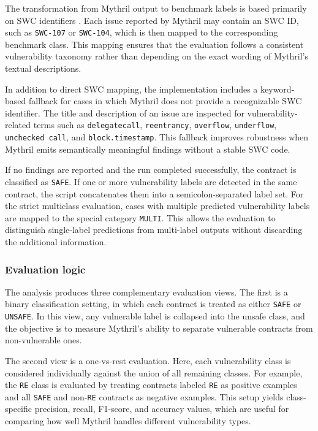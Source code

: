 \documentclass[a4paper,11pt]{article}\usepackage{graphicx} %
\begin{document}
The transformation from Mythril output to benchmark labels is based primarily on SWC identifiers \cite{noauthor_smart_nodate}. Each issue reported by Mythril may contain an SWC ID, such as \texttt{SWC-107} or \texttt{SWC-104}, which is then mapped to the corresponding benchmark class. This mapping ensures that the evaluation follows a consistent vulnerability taxonomy rather than depending on the exact wording of Mythril's textual descriptions.

In addition to direct SWC mapping, the implementation includes a keyword-based fallback for cases in which Mythril does not provide a recognizable SWC identifier. The title and description of an issue are inspected for vulnerability-related terms such as \texttt{delegatecall}, \texttt{reentrancy}, \texttt{overflow}, \texttt{underflow}, \texttt{unchecked call}, and \texttt{block.timestamp}. This fallback improves robustness when Mythril emits semantically meaningful findings without a stable SWC code.

If no findings are reported and the run completed successfully, the contract is classified as \texttt{SAFE}. If one or more vulnerability labels are detected in the same contract, the script concatenates them into a semicolon-separated label set. For the strict multiclass evaluation, cases with multiple predicted vulnerability labels are mapped to the special category \texttt{MULTI}. This allows the evaluation to distinguish single-label predictions from multi-label outputs without discarding the additional information.

\subsubsection{Evaluation logic}

The analysis produces three complementary evaluation views. The first is a binary classification setting, in which each contract is treated as either \texttt{SAFE} or \texttt{UNSAFE}. In this view, any vulnerable label is collapsed into the unsafe class, and the objective is to measure Mythril's ability to separate vulnerable contracts from non-vulnerable ones.

The second view is a one-vs-rest evaluation. Here, each vulnerability class is considered individually against the union of all remaining classes. For example, the \texttt{RE} class is evaluated by treating contracts labeled \texttt{RE} as positive examples and all \texttt{SAFE} and non-\texttt{RE} contracts as negative examples. This setup yields class-specific precision, recall, F1-score, and accuracy values, which are useful for comparing how well Mythril handles different vulnerability types.
\end{document}
